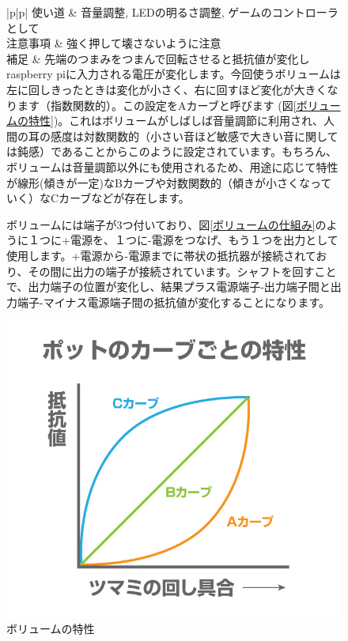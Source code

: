 \begin{figure}[H]
	\begin{tabular}{|p{\colF}|p{\colG}|} \hline
	使い道 & 音量調整, LEDの明るさ調整, ゲームのコントローラとして\\ \hline
	注意事項 & 強く押して壊さないように注意\\ \hline
	補足 & 先端のつまみをつまんで回転させると抵抗値が変化しraspberry piに入力される電圧が変化します。今回使うボリュームは左に回しきったときは変化が小さく、右に回すほど変化が大きくなります（指数関数的）。この設定をAカーブと呼びます (図\ref{ボリュームの特性})。これはボリュームがしばしば音量調節に利用され、人間の耳の感度は対数関数的（小さい音ほど敏感で大きい音に関しては鈍感）であることからこのように設定されています。もちろん、ボリュームは音量調節以外にも使用されるため、用途に応じて特性が線形(傾きが一定)なBカーブや対数関数的（傾きが小さくなっていく）なCカーブなどが存在します。\par
ボリュームには端子が3つ付いており、図\ref{ボリュームの仕組み}のように１つに+電源を、１つに-電源をつなげ、もう１つを出力として使用します。+電源から-電源までに帯状の抵抗器が接続されており、その間に出力の端子が接続されています。シャフトを回すことで、出力端子の位置が変化し、結果プラス電源端子-出力端子間と出力端子-マイナス電源端子間の抵抗値が変化することになります。
	\begin{minipage}[t]{0.45\linewidth}
    \smallskip
      \centering
      \includegraphics[width=\linewidth]{images/chap05/text05-img050.jpg}
      \caption{ボリュームの特性}

\end{minipage}
\end{tabular}
\end{figure}
